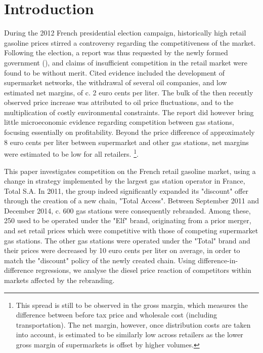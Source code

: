\documentclass[english]{article}
\begin{document}
\newpage{}


\section{Introduction}

During the 2012 French presidential election campaign, historically high retail gasoline prices stirred a controversy regarding the competitiveness of the market. Following the election, a report was thus requested by the newly formed government (\cite{BEL12}), and claims of insufficient competition in the retail market were found to be without merit. Cited evidence included the development of supermarket networks, the withdrawal of several oil companies, and low estimated net margins, of c. 2 euro cents per liter. The bulk of the then recently observed price increase was attributed to oil price fluctuations, and to the multiplication of costly environmental constraints. The report did however bring little microeconomic evidence regarding competition between gas stations, focusing essentially on profitability. Beyond the price difference of approximately 8 euro cents per liter between supermarket and other gas stations, net margins were estimated to be low for all retailers.%
\footnote{This spread is still to be observed in the gross margin, which measures the difference between before tax price and wholesale cost (including transportation). The net margin, however, once distribution costs are taken into account, is estimated to be similarly low across retailers as the lower gross margin of supermarkets is offset by higher volumes.}.

This paper investigates competition on the French retail gasoline market, using a change in strategy implemented by the largest gas station operator in France, Total S.A. In 2011, the group indeed significantly expanded its "discount" offer through the creation of a new chain, "Total Access". Between September 2011 and December 2014, c. 600 gas stations were consequently rebranded. Among these, 250 used to be operated under the "Elf" brand, originating from a prior merger, and set retail prices which were competitive with those of competing supermarket gas stations. The other gas stations were operated under the "Total" brand and their prices were decreased by 10 euro cents per liter on average, in order to match the "discount" policy of the newly created chain. Using difference-in-difference regressions, we analyse the diesel price reaction of competitors within markets affected by the rebranding.
\end{document}
